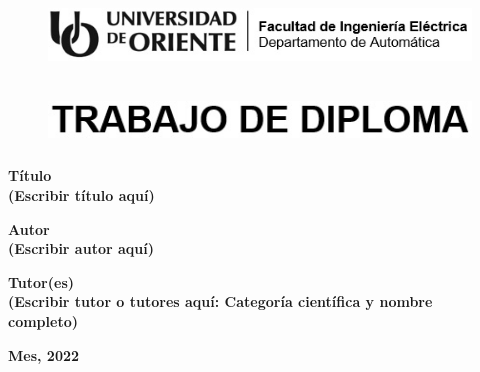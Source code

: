 \thispagestyle{empty}

\marginsize{3cm}{2cm}{2cm}{2cm} 

\begin{figure}[h]
    \centering
    \includegraphics[width=15cm, height=2cm]{imagenes/identidad en blanco y negro.jpg}
\end{figure}

\vspace{1cm}

\begin{figure}[h]
    \centering
    \includegraphics[width=14cm, height=1.5cm]{imagenes/trabajo de diploma}
\end{figure}

\vspace{1cm}

\begin{center}
    \textbf{\large
        Título\\
        (Escribir título aquí)}
    \vspace{0.5cm}

    \textbf{\large Autor\\
    (Escribir autor aquí)}
    \vspace{0.5cm}

    \textbf{\large Tutor(es)\\
    (Escribir tutor o tutores aquí: Categoría científica y nombre\\
    completo)}

    \vfill

    \textbf{\large Mes, 2022}

\end{center}